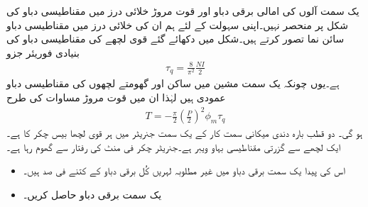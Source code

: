 یک سمت  آلوں کی امالی برقی دباو اور قوت مروڑ خلائی درز میں مقناطیسی دباو کی شکل پر منحصر نہیں۔اپنی سہولت کے لئے ہم ان کی خلائی درز میں مقناطیسی دباو سائن نما تصور کرتے ہیں۔شکل   میں دکھائے گئے قوی لچھے کی مقناطیسی دباو کی بنیادی فوریئر جزو
\begin{align}
\tau_q=\frac{8}{\pi^2} \frac{N I}{2}
\end{align}
ہے۔یوں چونکہ یک سمت  مشین میں ساکن اور گھومتے لچھوں کی مقناطیسی دباو عمودی ہیں لہٰذا ان میں قوت مروڑ مساوات   کی طرح
\begin{align}\label{مساوات_یکسمتی_مروڑ}
T=-\frac{\pi}{2}\left( \frac{P}{2}\right)^2 \phi_m \tau_q 
\end{align} 
ہو گی۔
%
دو قطب بارہ دندی میکانی سمت کار کے یک سمت  جنریٹر میں ہر قوی لچھا بیس چکر کا ہے۔ایک لچھے سے گزرتی مقناطیسی بہاو   ویبر ہے۔جنریٹر  چکر فی منٹ کی رفتار سے گھوم رہا ہے۔
\begin{itemize}
\item
اس کی پیدا یک سمت  برقی دباو میں غیر مطلوبہ لہریں کُل برقی دباو کے کتنے فی صد ہیں۔
\item
یک سمت  برقی دباو حاصل کریں۔
\end{itemize}

